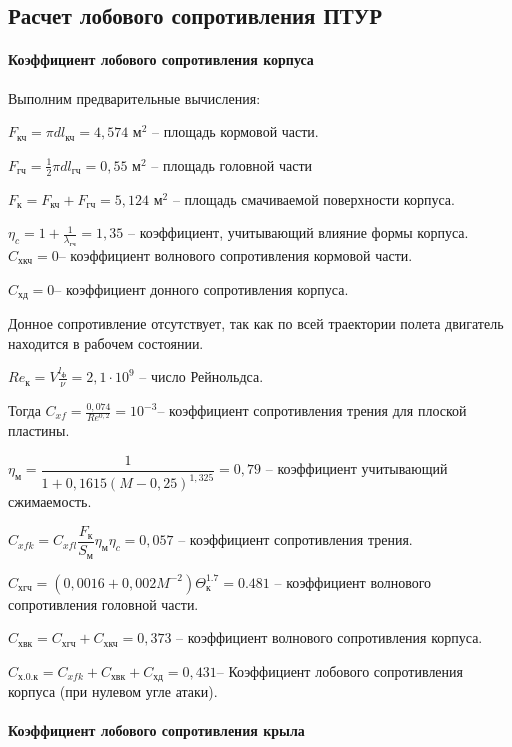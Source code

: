 \subsection{Расчет лобового сопротивления ПТУР}

\paragraph{Коэффициент лобового сопротивления корпуса}

Выполним предварительные вычисления:

$F_\text{кч}=\pi d l_\text{кч}=4,574 \text{ м}^2$ – площадь кормовой части.

$F_\text{гч}=\frac{1}{2} \pi d l_\text{гч}=0,55 \text{ м}^2$ – площадь головной части

$F_\text{к}=F_\text{кч}+F_\text{гч}=5,124 \text{ м}^2$ – площадь смачиваемой поверхности корпуса.

$\eta_c = 1 + \frac{1}{\lambda_\text{гч}} =1,35$ – коэффициент, учитывающий влияние формы корпуса.
$C_\text{хкч}=0 $– коэффициент волнового сопротивления кормовой части.

$C_\text{хд}=0 $– коэффициент донного сопротивления корпуса.

Донное сопротивление отсутствует, так как по всей траектории полета двигатель находится в рабочем состоянии.

$Re_\text{к}=V \frac{l_\text{ф}}{\nu}=2,1 \cdot 10^9 $ – число Рейнольдса.

Тогда $C_{xf}=\frac{0,074}{Re^{0,2}} =10^{-3}$– коэффициент сопротивления трения для плоской пластины.

$\eta_\text{м} = \dfrac{1} {1+0,1615 (M-0,25)^{1,325}} =0,79$ – коэффициент учитывающий сжимаемость.

$C_{xfk} = C_{xfl} \dfrac{F_\text{к}} {S_\text{м}}  \eta_\text{м} \eta_c =0,057$ – коэффициент сопротивления трения.

$C_\text{хгч}=(0,0016+0,002M^{-2} )  \Theta_\text{к}^{1.7}=0.481$ – коэффициент волнового сопротивления головной части.

$C_\text{хвк}=C_\text{хгч}+C_\text{хкч}=0,373$ – коэффициент волнового сопротивления корпуса.

$C_\text{х.0.к}=C_{xfk}+C_\text{хвк}+C_\text{хд}=0,431 $– Коэффициент лобового сопротивления корпуса (при нулевом угле атаки).

\paragraph{Коэффициент лобового сопротивления крыла}

